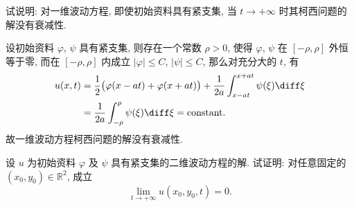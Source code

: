\begin{exercise}
  试说明: 对一维波动方程, 即使初始资料具有紧支集,
  当 $t\to +\infty$ 时其柯西问题的解没有衰减性.
\end{exercise}

\begin{solve}
  设初始资料 $\varphi$, $\psi$ 具有紧支集, 则存在一个常数 $\rho>0$,
  使得 $\varphi$, $\psi$ 在 $[-\rho,\rho]$ 外恒等于零,
  而在 $[-\rho,\rho]$ 内成立 $|\varphi|\leq C$, $|\psi|\leq C$, 那么对充分大的 $t$, 有
  \begin{align*}
    u(x,t)
    & = \frac{1}{2}\bigl(\varphi(x-at)
        +\varphi(x+at)\bigr)+\frac{1}{2a}\int_{x-at}^{x+at}\psi(\xi)\diff\xi \\
    & = \frac{1}{2a}\int_{-\rho}^{\rho}\psi(\xi)\diff\xi= \text{constant}.
  \end{align*}
  故一维波动方程柯西问题的解没有衰减性.
\end{solve}


\begin{exercise}
  设 $u$ 为初始资料 $\varphi$ 及 $\psi$ 具有紧支集的二维波动方程的解.
  试证明: 对任意固定的 $(x_0,y_0)\in \mathbb{R}^2$, 成立
  \[\lim_{t\to+\infty} u(x_0,y_0,t) = 0.\]
\end{exercise}

